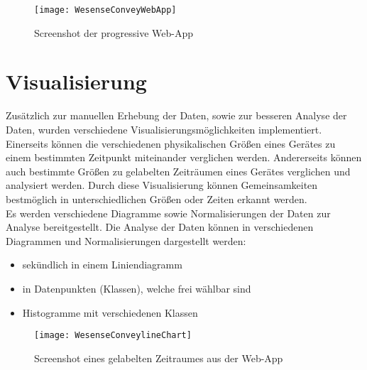         \begin{figure}[h]
            \centering
            \texttt{[image: WesenseConveyWebApp]}
            \caption{Screenshot der progressive Web-App}
            \label{fig:WebApp1}
        \end{figure}

\section{Visualisierung}\label{VisualisierungWebApp}

        Zusätzlich zur manuellen Erhebung der Daten, sowie zur besseren Analyse der Daten, wurden verschiedene Visualisierungsmöglichkeiten implementiert.
        Einerseits können die verschiedenen physikalischen Größen eines Gerätes zu einem bestimmten Zeitpunkt miteinander verglichen werden.
        Andererseits können auch bestimmte Größen zu gelabelten Zeiträumen eines Gerätes verglichen und analysiert werden. 
        Durch diese Visualisierung können Gemeinsamkeiten bestmöglich in unterschiedlichen Größen oder Zeiten erkannt werden.\\
        \newline
        Es werden verschiedene Diagramme sowie Normalisierungen der Daten zur Analyse bereitgestellt.
        Die Analyse der Daten können in verschiedenen Diagrammen und Normalisierungen dargestellt werden:
        \begin{itemize}
            \item sekündlich in einem Liniendiagramm
            \item in Datenpunkten (Klassen), welche frei wählbar sind
            \item Histogramme mit verschiedenen Klassen
        \end{itemize}

        \begin{figure}[h]
            \centering
            \texttt{[image: WesenseConveylineChart]}
            \caption{Screenshot eines gelabelten Zeitraumes aus der Web-App}
            \label{fig:WebApp2}
        \end{figure}
